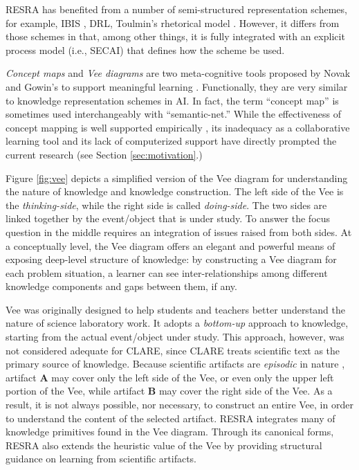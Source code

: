 RESRA has benefited from a number of semi-structured representation
schemes, for example, IBIS \cite{Kunz70,Conklin88}, DRL\cite{Lee91What},
Toulmin's rhetorical model \cite{Toulmin58,Cavalli-Sforza92}. However, it
differs from those schemes in that, among other things, it is fully
integrated with an explicit process model (i.e., SECAI) that defines how
the scheme be used.

{\it Concept maps\/} and {\it Vee diagrams\/} are two meta-cognitive tools
proposed by Novak and Gowin's to support meaningful learning
\cite{Gowin81,Novak84}. Functionally, they are very similar to knowledge
representation schemes in AI. In fact, the term ``concept map'' is
sometimes used interchangeably with ``semantic-net.'' While the
effectiveness of concept mapping is well supported empirically
\cite{Cliburn90,Novak90,Roth92}, its inadequacy as a collaborative learning
tool and its lack of computerized support have directly prompted the
current research (see Section \ref{sec:motivation}.)

Figure \ref{fig:vee} depicts a simplified version of the Vee diagram for
understanding the nature of knowledge and knowledge construction. The left
side of the Vee is the {\it thinking-side\/}, while the right side is
called {\it doing-side\/}. The two sides are linked together by the
event/object that is under study. To answer the focus question in the
middle requires an integration of issues raised from both sides. At a
conceptually level, the Vee diagram offers an elegant and powerful means of
exposing deep-level structure of knowledge: by constructing a Vee diagram
for each problem situation, a learner can see inter-relationships among
different knowledge components and gaps between them, if any.

\begin{quotation}
\end{quotation}

Vee was originally designed to help students and teachers better understand
the nature of science laboratory work. It adopts a {\it bottom-up\/}
approach to knowledge, starting from the actual event/object under
study. This approach, however, was not considered adequate for CLARE, since
CLARE treats scientific text as the primary source of knowledge. Because
scientific artifacts are {\it episodic\/} in nature \cite{Swaminathan90},
artifact {\bf A} may cover only the left side of the Vee, or even only the
upper left portion of the Vee, while artifact {\bf B} may cover the right
side of the Vee. As a result, it is not always possible, nor necessary, to
construct an entire Vee, in order to understand the content of the selected
artifact.  RESRA integrates many of knowledge primitives found in the Vee
diagram. Through its canonical forms, RESRA also extends the heuristic
value of the Vee by providing structural guidance on learning from
scientific artifacts.



